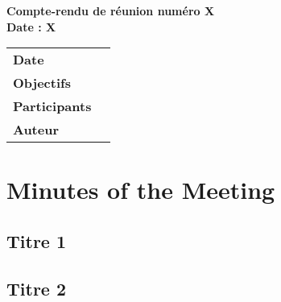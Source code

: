 \documentclass[a4wide,10pt]{article}
\begin{document}
\thispagestyle{empty}

\begin{center}
\LARGE \bfseries  Compte-rendu de réunion numéro X  \\
\large \bfseries  Date : X

\vspace{0.33cm}
\end{center}

\begin{center}
\begin{tabular}{ p{2.2cm}  p{13.6cm} }
\textbf{Date} &  \\ 
\textbf{Objectifs} &   \\
\textbf{Participants} &  \\ 
\textbf{Auteur} &  \\
\end{tabular}
\end{center}

\section*{Minutes of the Meeting}

\subsection*{Titre 1}

\subsection*{Titre 2}

\subsection*{\color{red}{Prochaine réunion : }}
\end{document}

